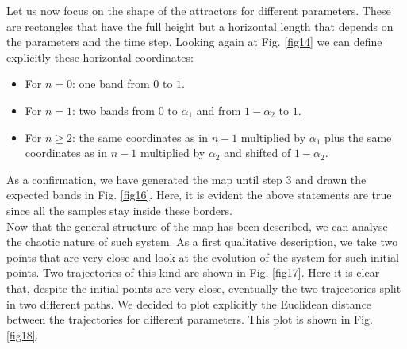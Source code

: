 \documentclass[11pt,titlepage]{article}
\begin{document}
Let us now focus on the shape of the attractors for different parameters. These are rectangles that have the full height but a horizontal length that depends on the parameters and the time step. Looking again at Fig. \ref{fig14} we can define explicitly these horizontal coordinates:
\begin{itemize}
	\item For $n=0$: one band from $0$ to $1$.
	\item For $n=1$: two bands from $0$ to $\alpha_1$ and from $1-\alpha_2$ to $1$.
	\item For $n\ge 2$: the same coordinates as in $n-1$ multiplied by $\alpha_1$ plus the same coordinates as in $n-1$ multiplied by $\alpha_2$ and shifted of $1-\alpha_2$.
\end{itemize}
As a confirmation, we have generated the map until step $3$ and drawn the expected bands in Fig. \ref{fig16}. Here, it is evident the above statements are true since all the samples stay inside these borders. \\
Now that the general structure of the map has been described, we can analyse the chaotic nature of such system. As a first qualitative description, we take two points that are very close and look at the evolution of  the system for such initial points. Two trajectories of this kind are shown in Fig. \ref{fig17}. Here it is clear that, despite the initial points are very close, eventually the two trajectories split in two different paths. We decided to plot explicitly the Euclidean distance between the trajectories for different parameters. This plot is shown in Fig. \ref{fig18}.
\end{document}
